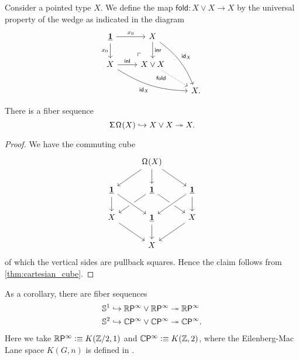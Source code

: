 \begin{defn}
Consider a pointed type $X$. We define the map $\mathsf{fold}:X\vee X\to X$ by the universal property of the wedge as indicated in the diagram
\begin{equation*}
\begin{tikzcd}
\unit \arrow[d,swap,"x_0"] \arrow[r,"x_0"] \arrow[dr, phantom, "\ulcorner", very near end] & X \arrow[d,"\inr"] \arrow[ddr,bend left=15,"{\idfunc[X]}"] \\
X \arrow[r,"\inl"] \arrow[drr,bend right=15,swap,"{\idfunc[X]}"] & X\vee X \arrow[dr,densely dotted,near start,swap,"\mathsf{fold}"] \\
& & X.
\end{tikzcd}
\end{equation*}
\end{defn}

\begin{prp}
There is a fiber sequence
\begin{equation*}
\mathsf{\Sigma}^{}\mathsf{\Omega}^{}(X) \hookrightarrow X\vee X \twoheadrightarrow X.
\end{equation*}
\end{prp}

\begin{proof}
We have the commuting cube 
\begin{equation*}
\begin{tikzcd}
& \loopspace{X} \arrow[dl] \arrow[d] \arrow[dr] \\
\unit \arrow[d] & \unit \arrow[dl] \arrow[dr] & \unit \arrow[dl,crossing over] \arrow[d] \\
X \arrow[dr] & \unit \arrow[from=ul,crossing over] \arrow[d] & X \arrow[dl] \\
& X
\end{tikzcd}
\end{equation*}
of which the vertical sides are pullback squares. Hence the claim follows from \cref{thm:cartesian_cube}.
\end{proof}

\begin{rmk}
As a corollary, there are fiber sequences
\begin{align*}
\mathbb{S}^{1} \hookrightarrow \mathbb{R}\mathsf{P}^{\infty}\vee \mathbb{R}\mathsf{P}^{\infty} & \twoheadrightarrow \mathbb{R}\mathsf{P}^{\infty} \\
\mathbb{S}^{2} \hookrightarrow \mathbb{C}\mathsf{P}^{\infty}\vee \mathbb{C}\mathsf{P}^{\infty} & \twoheadrightarrow \mathbb{C}\mathsf{P}^{\infty}.
\end{align*}
Here we take $\mathbb{R}\mathsf{P}^{\infty}\vcentcolon\equiv K(\mathbb{Z}/2,1)$ and $\mathbb{C}\mathsf{P}^{\infty}\vcentcolon\equiv K(\mathbb{Z},2)$, where the Eilenberg-Mac Lane space $K(G,n)$ is defined in \cite{FinsterLicata}.
\end{rmk}

